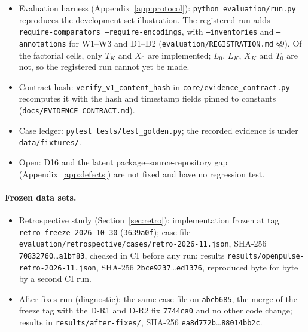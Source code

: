 \documentclass[11pt,a4paper]{article}
\newcommand{\code}[1]{\texttt{#1}}
\begin{document}
\begin{itemize}[leftmargin=*,nosep]
    Table~\ref{tab:cost} is not yet a benchmark option.
  \item Evaluation harness (Appendix~\ref{app:protocol}):
    \code{python evaluation/run.py} reproduces the development-set
    illustration. The registered run adds \code{--require-comparators
    --require-encodings}, with \code{--inventories} and
    \code{--annotations} for W1--W3 and D1--D2
    (\code{evaluation/REGISTRATION.md} \S9). Of the factorial cells,
    only $T_K$ and $X_0$ are implemented; $L_0$, $L_K$, $X_K$ and $T_0$
    are not, so the registered run cannot yet be made.
  \item Contract hash: \code{verify\_v1\_content\_hash} in
    \code{core/evidence\_contract.py} recomputes it with the hash and
    timestamp fields pinned to constants
    (\code{docs/EVIDENCE\_CONTRACT.md}).
  \item Case ledger: \code{pytest tests/test\_golden.py}; the recorded
    evidence is under \code{data/fixtures/}.
  \item Open: D16 and the latent package--source-repository gap
    (Appendix~\ref{app:defects}) are not fixed and have no regression
    test.
\end{itemize}

\paragraph{Frozen data sets.}
\begin{itemize}[leftmargin=*,nosep]
  \item Retrospective study (Section~\ref{sec:retro}): implementation
    frozen at tag \code{retro-freeze-2026-10-30} (\code{3639a0f});
    case file \code{evaluation/retrospective/cases/retro-2026-11.json},
    SHA-256 \code{70832760}\ldots\code{a1bf83}, checked in CI before
    any run; results \code{results/openpulse-retro-2026-11.json},
    SHA-256 \code{2bce9237}\ldots\code{ed1376}, reproduced byte for
    byte by a second CI run.
  \item After-fixes run (diagnostic): the same case file on
    \code{abcb685}, the merge of the freeze tag with the D-R1 and D-R2
    fix \code{7744ca0} and no other code change; results in
    \code{results/after-fixes/}, SHA-256
    \code{ea8d772b}\ldots\code{88014bb2c}.
\end{itemize}
\end{document}
